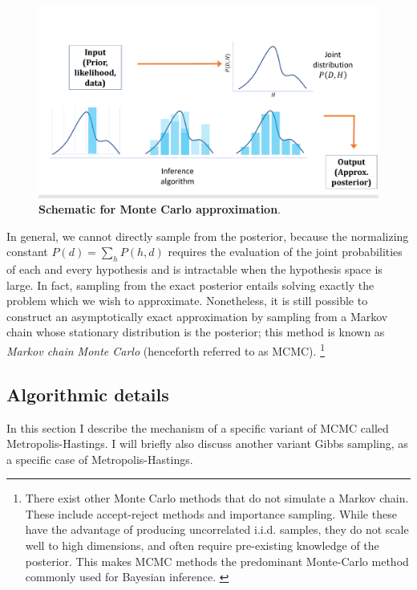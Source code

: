 \begin{figure}
\centering
\includegraphics[width = \textwidth]{figures/MonteCarlo_schematic.pdf}
\caption{\textbf{Schematic for Monte Carlo approximation}. }
\label{fig:MC_schematic}
\end{figure}

In general, we cannot directly sample from the posterior, because the normalizing constant $P(d) = \sum_{h} P(h,d)$ requires the evaluation of the joint probabilities of each and every hypothesis and is intractable when the hypothesis space is large. In fact, sampling from the exact posterior entails solving exactly the problem which we wish to approximate. Nonetheless, it is still possible to construct an asymptotically exact approximation by sampling from a Markov chain whose stationary distribution is the posterior; this method is known as \emph{Markov chain Monte Carlo} (henceforth referred to as MCMC). \footnote{There exist other Monte Carlo methods that do not simulate a Markov chain. These include accept-reject methods and importance sampling. While these have the advantage of producing uncorrelated i.i.d. samples, they do not scale well to high dimensions, and often require pre-existing knowledge of the posterior. This makes MCMC methods the predominant Monte-Carlo method commonly used for Bayesian inference. \cite{neal1993probabilistic, andrieu2003introduction}}

\subsection{Algorithmic details}

In this section I describe the mechanism of a specific variant of MCMC called Metropolis-Hastings. I will briefly also discuss another variant Gibbs sampling, as a specific case of Metropolis-Hastings.

